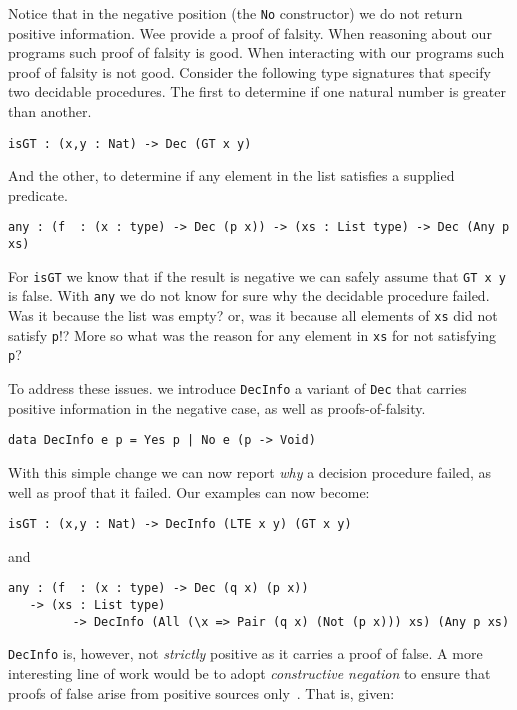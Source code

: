 \documentclass[%
draft,
a4paper,
UKenglish,
cleveref,
autoref,
thm-restate,
pdfa
]{oasics-v2021}
\begin{document}
\noindent
Notice that in the negative position (the \texttt{No} constructor) we do not return positive information.
Wee provide a proof of falsity.
When reasoning about our programs such proof of falsity is good.
When interacting with our programs such proof of falsity is not good.
Consider the following type signatures that specify two decidable procedures.
The first to determine if one natural number is greater than another.

\begin{verbatim}
isGT : (x,y : Nat) -> Dec (GT x y)
\end{verbatim}

\noindent
And the other, to determine if any element in the list satisfies a supplied predicate.

\begin{verbatim}
any : (f  : (x : type) -> Dec (p x)) -> (xs : List type) -> Dec (Any p xs)
\end{verbatim}

For \texttt{isGT} we know that if the result is negative we can safely assume that \texttt{GT x y} is false.
With \texttt{any} we do not know for sure why the decidable procedure failed.
Was it because the list was empty?
or,
was it because all elements of \texttt{xs} did not satisfy \texttt{p}!?
More so what was the reason for any element in \texttt{xs} for not satisfying \texttt{p}?

To address these issues. we introduce \texttt{DecInfo} a variant of \texttt{Dec} that carries positive information in the negative case, as well as proofs-of-falsity.

\begin{verbatim}
data DecInfo e p = Yes p | No e (p -> Void)
\end{verbatim}

With this simple change we can now report \emph{why} a decision procedure failed, as well as proof that it failed.
Our examples can now become:

\begin{verbatim}
isGT : (x,y : Nat) -> DecInfo (LTE x y) (GT x y)
\end{verbatim}

\noindent
and

\begin{verbatim}
any : (f  : (x : type) -> Dec (q x) (p x))
   -> (xs : List type)
         -> DecInfo (All (\x => Pair (q x) (Not (p x))) xs) (Any p xs)
\end{verbatim}

\texttt{DecInfo} is, however, not \emph{strictly} positive as it carries a proof of false.
A more interesting line of work would be to adopt \emph{constructive negation} to ensure that proofs of false arise from positive sources only~\cite{msfp/Atkey22}.
That is, given:
\end{document}
